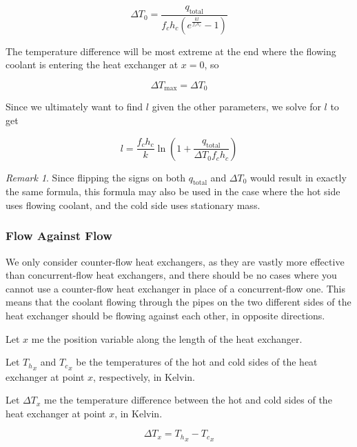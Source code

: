 \documentclass{article}
\numberwithin{equation}{subsection}
\theoremstyle{remark}
\newtheorem*{remark}{Remark}
\newcommand{\qtotal}{q_{\mathrm{total}}}
\newcommand{\DeltaT}{\Delta{}T}
\newcommand{\DeltaTmax}{\DeltaT_{\mathrm{max}}}
\begin{document}
\begin{equation}
\DeltaT_{0} = \frac{\qtotal}{f_{c} h_{c} \left(e^{\frac{k l}{f_{c} h_{c}}} - 1\right)}
\end{equation}

The temperature difference will be most extreme at the end where the flowing coolant is entering the heat exchanger at \(x = 0\), so

\begin{equation}
\DeltaTmax = \DeltaT_{0}
\end{equation}

Since we ultimately want to find \(l\) given the other parameters, we solve for \(l\) to get

\begin{equation}
l = \frac{f_{c} h_{c}}{k} \ln \left(1 + \frac{\qtotal}{\DeltaT_{0} f_{c} h_{c}}\right)
\end{equation}

\begin{remark}
Since flipping the signs on both \(\qtotal\) and \(\DeltaT_{0}\) would result in exactly the same formula, this formula may also be used in the case where the hot side uses flowing coolant, and the cold side uses stationary mass.
\end{remark}

\subsubsection{Flow Against Flow}

We only consider counter-flow heat exchangers, as they are vastly more effective than concurrent-flow heat exchangers, and there should be no cases where you cannot use a counter-flow heat exchanger in place of a concurrent-flow one.
This means that the coolant flowing through the pipes on the two different sides of the heat exchanger should be flowing against each other, in opposite directions.

Let \(x\) me the position variable along the length of the heat exchanger.

Let \({T_{h}}_{x}\) and \({T_{c}}_{x}\) be the temperatures of the hot and cold sides of the heat exchanger at point \(x\), respectively, in Kelvin.

Let \(\DeltaT_{x}\) me the temperature difference between the hot and cold sides of the heat exchanger at point \(x\), in Kelvin.

\begin{equation}
\DeltaT_{x} = {T_{h}}_{x} - {T_{c}}_{x}
\end{equation}
\end{document}
